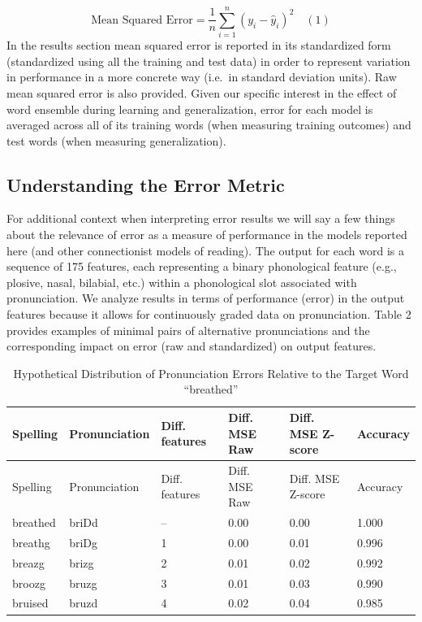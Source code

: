 \documentclass[
  ,man,floatsintext]{apa6}
\begin{document}
\[
\text{Mean Squared Error} = \frac{1}{n} \sum_{i=1}^{n} (y_i - \hat{y}_i)^2
\quad (1) 
\]
In the results section mean squared error is reported in its standardized form (standardized using all the training and test data) in order to represent variation in performance in a more concrete way (i.e.~in standard deviation units). Raw mean squared error is also provided. Given our specific interest in the effect of word ensemble during learning and generalization, error for each model is averaged across all of its training words (when measuring training outcomes) and test words (when measuring generalization).

\subsection{Understanding the Error Metric}\label{understanding-the-error-metric}

For additional context when interpreting error results we will say a few things about the relevance of error as a measure of performance in the models reported here (and other connectionist models of reading). The output for each word is a sequence of 175 features, each representing a binary phonological feature (e.g., plosive, nasal, bilabial, etc.) within a phonological slot associated with pronunciation. We analyze results in terms of performance (error) in the output features because it allows for continuously graded data on pronunciation. Table 2 provides examples of minimal pairs of alternative pronunciations and the corresponding impact on error (raw and standardized) on output features.

\begin{longtable}[]{@{}llllll@{}}
\caption{\label{tab:table2} Hypothetical Distribution of Pronunciation Errors Relative to the Target Word ``breathed''}\tabularnewline
\toprule\noalign{}
Spelling & Pronunciation & Diff. features & Diff. MSE Raw & Diff. MSE Z-score & Accuracy \\
\midrule\noalign{}
\endfirsthead
\toprule\noalign{}
Spelling & Pronunciation & Diff. features & Diff. MSE Raw & Diff. MSE Z-score & Accuracy \\
\midrule\noalign{}
\endhead
\bottomrule\noalign{}
\endlastfoot
breathed & briDd & -- & 0.00 & 0.00 & 1.000 \\
breathg & briDg & 1 & 0.00 & 0.01 & 0.996 \\
breazg & brizg & 2 & 0.01 & 0.02 & 0.992 \\
broozg & bruzg & 3 & 0.01 & 0.03 & 0.990 \\
bruised & bruzd & 4 & 0.02 & 0.04 & 0.985 \\
\end{longtable}
\end{document}
